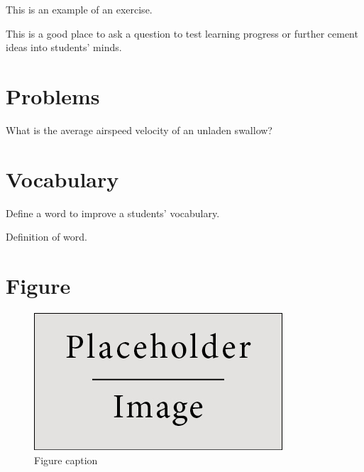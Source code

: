 \documentclass[11pt,fleqn]{book} %
\begin{document}
This is an example of an exercise.

\begin{exercise}
This is a good place to ask a question to test learning progress or further cement ideas into students' minds.
\end{exercise}


\section{Problems}

\begin{problem}
What is the average airspeed velocity of an unladen swallow?
\end{problem}


\section{Vocabulary}

Define a word to improve a students' vocabulary.

\begin{vocabulary}[Word]
Definition of word.
\end{vocabulary}



\section{Figure}

\begin{figure}[h]
\centering\includegraphics[scale=0.5]{Pictures/placeholder.jpg}
\caption{Figure caption}
\label{fig:placeholder} %
\end{figure}
\end{document}
